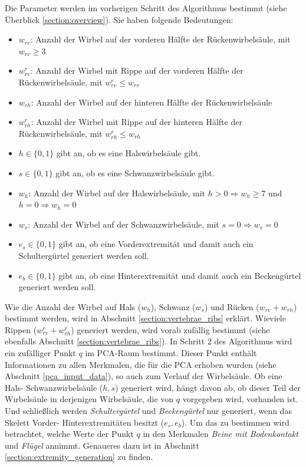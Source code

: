 \newpage
Die Parameter werden im vorherigen Schritt des Algorithmus bestimmt (siehe Überblick \ref{section:overview}). Sie haben folgende Bedeutungen:
\begin{itemize}
 \item $w_{rv}$: Anzahl der Wirbel auf der vorderen Hälfte der Rückenwirbelsäule, mit $w_{rv} \geq 3$
 \item $w_{rv}^r$: Anzahl der Wirbel mit Rippe auf der vorderen Hälfte der Rückenwirbelsäule, mit $w_{rv}^r \leq w_{rv}$
 \item $w_{rh}$: Anzahl der Wirbel auf der hinteren Hälfte der Rückenwirbelsäule
 \item $w_{rh}^r$: Anzahl der Wirbel mit Rippe auf der hinteren Hälfte der Rückenwirbelsäule, mit $w_{rh}^r \leq w_{rh}$
 \item $h \in \{0,1\}$ gibt an, ob es eine Halswirbelsäule gibt.
 \item $s \in \{0,1\}$ gibt an, ob es eine Schwanzwirbelsäule gibt.
 \item $w_h$: Anzahl der Wirbel auf der Halswirbelsäule, mit $h > 0 \Rightarrow w_h \geq 7$ und \mbox{$h = 0 \Rightarrow w_h = 0$}
 \item $w_s$: Anzahl der Wirbel auf der Schwanzwirbelsäule, mit $s = 0 \Rightarrow w_s = 0$
 \item $e_s \in \{0, 1\}$ gibt an, ob eine Vorderextremität und damit auch ein Schultergürtel generiert werden soll.
 \item $e_b \in \{0, 1\}$ gibt an, ob eine Hinterextremität und damit auch ein Beckengürtel generiert werden soll.
\end{itemize}

Wie die Anzahl der Wirbel auf Hals ($w_h$), Schwanz ($w_s$) und Rücken ($w_{rv} + w_{rh}$) bestimmt werden, wird in Abschnitt \ref{section:vertebrae_ribs} erklärt.
Wieviele Rippen ($w_{rv}^r + w_{rh}^r$) generiert werden, wird vorab zufällig bestimmt (siehe ebenfalls Abschnitt \ref{section:vertebrae_ribs}).
In Schritt $2$ des Algorithmus wird ein zufälliger Punkt $q$ im PCA-Raum bestimmt.
Dieser Punkt enthält Informationen zu allen Merkmalen, die für die PCA erhoben wurden (siehe Abschnitt \ref{pca_input_data}), so auch zum Verlauf der Wirbelsäule.
Ob eine Hals- \bzw Schwanzwirbelsäule ($h, s$) generiert wird, hängt davon ab, ob dieser Teil der Wirbelsäule in derjenigen Wirbelsäule, die von $q$ vorgegeben wird, vorhanden ist.
Und schließlich werden \emph{Schultergürtel} und \emph{Beckengürtel} nur generiert, wenn das Skelett Vorder- \bzw Hinterextremitäten besitzt ($e_s, e_b$). Um das zu bestimmen wird \ua betrachtet, welche Werte der Punkt $q$ in den Merkmalen \emph{Beine mit Bodenkontakt} und \emph{Flügel} annimmt. Genaueres dazu ist in Abschnitt \ref{section:extremity_generation} zu finden.

